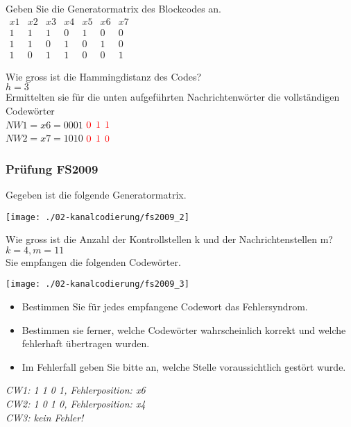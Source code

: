 Geben Sie die Generatormatrix des Blockcodes an.\\
$\begin{matrix}
    x1 & x2 & x3 & x4 & x5 & x6 & x7\\
    1 & 1 & 1 & 0 & 1 & 0 & 0\\
    1 & 1 & 0 & 1 & 0 & 1 & 0\\
    1 & 0 & 1 & 1 & 0 & 0 & 1
\end{matrix}$

Wie gross ist die Hammingdistanz des Codes?\\
$h=3$\\

Ermittelten sie für die unten aufgeführten Nachrichtenwörter die vollständigen Codewörter\\
$NW1 = x6 = 0001$ $\textcolor{red}{0}$ $\textcolor{red}{1}$ $\textcolor{red}{1}$\\
$NW2 = x7 = 1010$ $\textcolor{red}{0}$ $\textcolor{red}{1}$ $\textcolor{red}{0}$

\subsubsection{Prüfung FS2009}
Gegeben ist die folgende Generatormatrix.
\begin{center}
    \vspace{-8pt}
    \texttt{[image: ./02-kanalcodierung/fs2009\_2]}
    \vspace{-8pt}
\end{center}

Wie gross ist die Anzahl der Kontrollstellen k und der Nachrichtenstellen m?\\
$k=4, m=11$\\

Sie empfangen die folgenden Codewörter.
\begin{center}
    \vspace{-8pt}
    \texttt{[image: ./02-kanalcodierung/fs2009\_3]}
    \vspace{-8pt}
\end{center}

\begin{itemize}
    \item Bestimmen Sie für jedes empfangene Codewort das Fehlersyndrom.
    \item Bestimmen sie ferner, welche Codewörter wahrscheinlich korrekt und welche fehlerhaft übertragen wurden.
    \item Im Fehlerfall geben Sie bitte an, welche Stelle voraussichtlich gestört wurde.
\end{itemize}
\textit{CW1: 1 1 0 1, Fehlerposition: x6}\\
\textit{CW2: 1 0 1 0, Fehlerposition: x4}\\
\textit{CW3: kein Fehler!}\\

